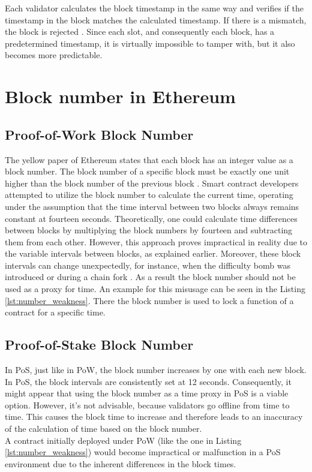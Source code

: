 Each validator calculates the block timestamp in the same way and verifies if
the timestamp in the block matches the calculated timestamp. If there is a
mismatch, the block is rejected \cite{process-execution-payload}. Since each
slot, and consequently each block, has a predetermined timestamp, it is
virtually impossible to tamper with, but it also becomes more predictable.

\section{Block number in Ethereum}
\subsection{Proof-of-Work Block Number}
The yellow paper of Ethereum states that each block has
an integer value as a block number. The block number
of a specific block must be exactly one unit higher than the block
number of the previous block \cite{ethyellowpaper2023}.
Smart contract developers attempted to utilize the block number to calculate
the current time, operating under the assumption that the time interval between
two blocks always remains constant at fourteen seconds. Theoretically, one could
calculate time differences between blocks by multiplying the block numbers by fourteen 
and subtracting them from each other.
However, this approach proves impractical in reality due to the variable
intervals between blocks, as explained earlier. Moreover, these block intervals
can change unexpectedly, for instance, when the difficulty bomb was introduced
or during a chain fork \cite{swc116}.
As a result the block number should not be used as a proxy for time.
An example for this misusage can be seen in the Listing \ref{lst:number_weakness}.
There the block number is used to lock a function of a contract for a specific time.



\subsection{Proof-of-Stake Block Number}
In PoS, just like in PoW, the block number increases by one with each new block.
In PoS, the block intervals are consistently set at 12 seconds.
Consequently, it might appear that using the block number as a time proxy in PoS is a viable option. 
However, it's not advisable, because validators go offline from time to time.
This causes the block time to increase and therefore leads to an inaccuracy of the calculation
of time based on the block number. \\
A contract initially deployed under PoW (like the one in Listing \ref{lst:number_weakness}) would
become impractical or malfunction in a PoS environment due to the inherent differences in the block times.

